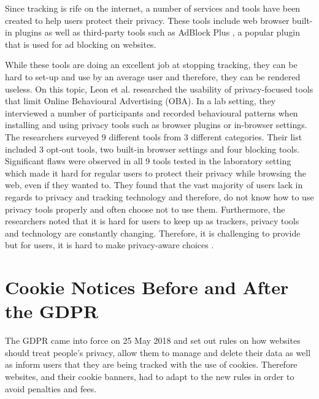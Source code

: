 \documentclass[../main.tex]{subfiles}
\begin{document}
Since tracking is rife on the internet, a number of services and tools have been created to help users protect their privacy. These tools include web browser built-in plugins as well as third-party tools such as AdBlock Plus \cite{adp}, a popular plugin that is used for ad blocking on websites. 

While these tools are doing an excellent job at stopping tracking, they can be hard to set-up and use by an average user and therefore, they can be rendered useless. On this topic, Leon et al. \cite{leon2012johnny} researched the usability of privacy-focused tools that limit Online Behavioural Advertising (OBA). In a lab setting, they interviewed a number of participants and recorded behavioural patterns when installing and using privacy tools such as browser plugins or in-browser settings. The researchers surveyed 9 different tools from 3 different categories. Their list included 3 opt-out tools, two built-in browser settings and four blocking tools. Significant flaws were observed in all 9 tools tested in the laboratory setting which made it hard for regular users to protect their privacy while browsing the web, even if they wanted to. They found that the vast majority of users lack  in regards to privacy and tracking technology and therefore, do not know how to use privacy tools properly and often choose not to use them. Furthermore, the researchers noted that it is hard for users to keep up as trackers, privacy tools and technology are constantly changing. Therefore, it is challenging to provide  but for users, it is hard to make privacy-aware choices .

\section{Cookie Notices Before and After the GDPR}
The GDPR came into force on 25 May 2018 and set out rules on how websites should treat people's privacy, allow them to manage and delete their data as well as inform users that they are being tracked with the use of cookies. Therefore websites, and their cookie banners, had to adapt to the new rules in order to avoid penalties and fees. 
\end{document}
